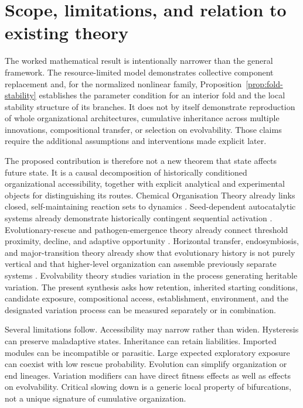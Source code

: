 \documentclass[11pt,a4paper]{article}
\begin{document}
\section{Scope, limitations, and relation to existing theory}

The worked mathematical result is intentionally narrower than the general framework. The resource-limited model demonstrates collective component replacement and, for the normalized nonlinear family, Proposition~\ref{prop:fold-stability} establishes the parameter condition for an interior fold and the local stability structure of its branches. It does not by itself demonstrate reproduction of whole organizational architectures, cumulative inheritance across multiple innovations, compositional transfer, or selection on evolvability. Those claims require the additional assumptions and interventions made explicit later.

The proposed contribution is therefore not a new theorem that state affects future state. It is a causal decomposition of historically conditioned organizational accessibility, together with explicit analytical and experimental objects for distinguishing its routes. Chemical Organisation Theory already links closed, self-maintaining reaction sets to dynamics \citep{Dittrich2007}. Seed-dependent autocatalytic systems already demonstrate historically contingent sequential activation \citep{Peng2022}. Evolutionary-rescue and pathogen-emergence theory already connect threshold proximity, decline, and adaptive opportunity \citep{Antia2003,Bell2017,Woolhouse2005}. Horizontal transfer, endosymbiosis, and major-transition theory already show that evolutionary history is not purely vertical and that higher-level organization can assemble previously separate systems \citep{Soucy2015,Archibald2015,SzathmarySmith1995}. Evolvability theory studies variation in the process generating heritable variation. The present synthesis asks how retention, inherited starting conditions, candidate exposure, compositional access, establishment, environment, and the designated variation process can be measured separately or in combination.

Several limitations follow. Accessibility may narrow rather than widen. Hysteresis can preserve maladaptive states. Inheritance can retain liabilities. Imported modules can be incompatible or parasitic. Large expected exploratory exposure can coexist with low rescue probability. Evolution can simplify organization or end lineages. Variation modifiers can have direct fitness effects as well as effects on evolvability. Critical slowing down is a generic local property of bifurcations, not a unique signature of cumulative organization.
\end{document}
